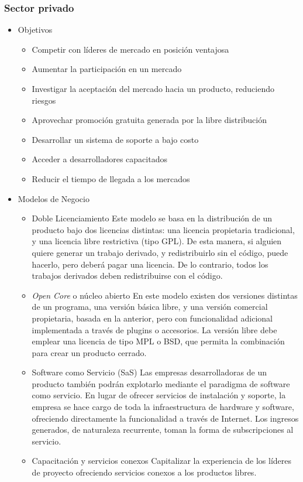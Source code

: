 \subsubsection {Sector privado}
\begin{itemize}
	\item Objetivos
		\begin{itemize}
		\item Competir con líderes de mercado en posición ventajosa
		\item Aumentar la participación en un mercado
		\item Investigar la aceptación del mercado hacia un producto, reduciendo riesgos
		\item Aprovechar promoción gratuita generada por la libre distribución 
		\item Desarrollar un sistema de soporte a bajo costo
		\item Acceder a desarrolladores capacitados
		\item Reducir el tiempo de llegada a los mercados
		\end{itemize}
	\item Modelos de Negocio
	\begin{itemize}

		\item Doble Licenciamiento
		\subitem Este modelo se basa en la distribución de un producto bajo dos licencias distintas: una licencia propietaria tradicional, y una licencia libre restrictiva (tipo GPL). De esta manera, si alguien quiere generar un trabajo derivado, y redistribuirlo sin el código, puede hacerlo, pero deberá pagar una licencia. De lo contrario, todos los trabajos derivados deben redistribuirse con el código.


		\item \emph{Open Core} o núcleo abierto
		\subitem En este modelo existen dos versiones distintas de un programa, una versión básica libre, y una versión comercial propietaria, basada en la anterior, pero con funcionalidad adicional
implementada a través de plugins o accesorios. La versión libre debe emplear
una licencia de tipo MPL o BSD, que permita la combinación para crear un
producto cerrado.

		\item Software como Servicio (SaS)
		\subitem Las empresas desarrolladoras de un producto también podrán explotarlo mediante el paradigma de software como servicio. En lugar de ofrecer servicios de instalación y soporte, la empresa se hace cargo de toda la infraestructura de hardware y software, ofreciendo directamente la funcionalidad a través de Internet. Los ingresos generados, de naturaleza recurrente, toman la forma de subscripciones al servicio.
 
		\item Capacitación y servicios conexos
		\subitem Capitalizar la experiencia de los líderes de proyecto ofreciendo servicios conexos a los productos libres.
	\end{itemize}	
\end{itemize}


